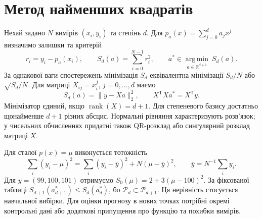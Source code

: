 \documentclass[11pt,a4paper]{article}
\newcommand{\R}{\mathbb R}
\newcommand{\PP}{\mathcal P}
\begin{document}
\section{Метод найменших квадратів}
Нехай задано $N$ вимірів $(x_i,y_i)$ та степінь $d$.
Для $p_a(x)=\sum_{j=0}^d a_j x^j$ визначимо залишки та критерій
\[
r_i=y_i-p_a(x_i),\qquad
S_d(a)=\sum_{i=0}^{N-1}r_i^2,\qquad
a^*\in\underset{a\in\R^{d+1}}{\operatorname{arg\,min}}\ S_d(a).
\]
За однакової ваги спостережень мінімізація $S_d$ еквівалентна мінімізації $S_d/N$ або $\sqrt{S_d/N}$.
Для матриці $X_{ij}=x_i^j$, $j=0,\dots,d$ маємо
\[
 S_d(a)=\|y-Xa\|_2^2,\qquad X^\mathsf{T}X a^*=X^\mathsf{T}y .
\]
Мінімізатор єдиний, якщо $\operatorname{rank}(X)=d+1$.
Для степеневого базису достатньо щонайменше $d+1$ різних абсцис.
Нормальні рівняння характеризують розв’язок; у чисельних обчисленнях придатні також QR-розклад або сингулярний розклад матриці $X$.

Для сталої $p(x)=\mu$ виконується тотожність
\[
  \sum_i(y_i-\mu)^2=\sum_i(y_i-\bar y)^2+N(\mu-\bar y)^2,\qquad
  \bar y=N^{-1}\sum_i y_i.
\]
Для $y=(99,100,101)$ отримуємо $S_0(\mu)=2+3(\mu-100)^2$.
За фіксованої таблиці $S_{d+1}(a^*_{d+1})\le S_d(a^*_d)$, бо $\PP_d\subset\PP_{d+1}$.
Ця нерівність стосується навчальної вибірки. Для оцінки прогнозу в нових точках потрібні окремі контрольні дані або додаткові припущення про функцію та похибки вимірів.
\end{document}
